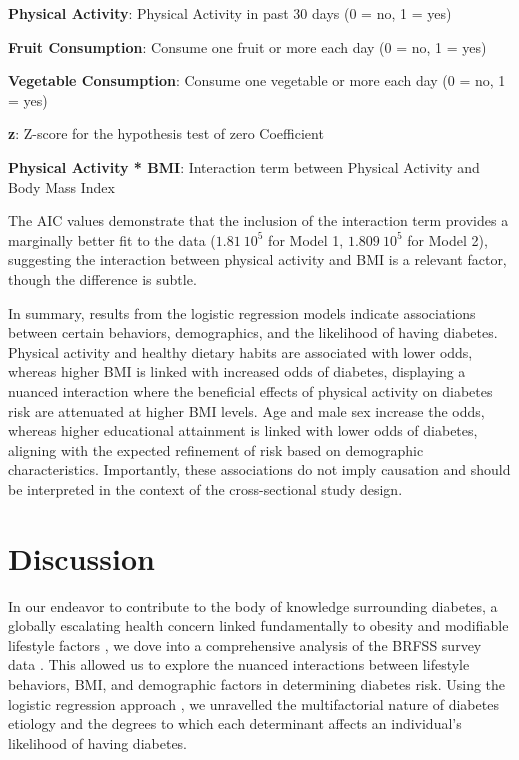 \documentclass[11pt]{article}
\begin{document}
\begin{table}[h]
\begin{threeparttable}
\begin{tablenotes}
\item \textbf{Physical Activity}: Physical Activity in past 30 days (0 = no, 1 = yes)
\item \textbf{Fruit Consumption}: Consume one fruit or more each day (0 = no, 1 = yes)
\item \textbf{Vegetable Consumption}: Consume one vegetable or more each day (0 = no, 1 = yes)
\item \textbf{z}: Z-score for the hypothesis test of zero Coefficient
\item \textbf{Physical Activity * BMI}: Interaction term between Physical Activity and Body Mass Index
\end{tablenotes}
\end{threeparttable}
\end{table}


The AIC values demonstrate that the inclusion of the interaction term provides a marginally better fit to the data (\hyperlink{R1b}{$1.81\ 10^{5}$} for Model 1, \hyperlink{R2b}{$1.809\ 10^{5}$} for Model 2), suggesting the interaction between physical activity and BMI is a relevant factor, though the difference is subtle. 

In summary, results from the logistic regression models indicate associations between certain behaviors, demographics, and the likelihood of having diabetes. Physical activity and healthy dietary habits are associated with lower odds, whereas higher BMI is linked with increased odds of diabetes, displaying a nuanced interaction where the beneficial effects of physical activity on diabetes risk are attenuated at higher BMI levels. Age and male sex increase the odds, whereas higher educational attainment is linked with lower odds of diabetes, aligning with the expected refinement of risk based on demographic characteristics. Importantly, these associations do not imply causation and should be interpreted in the context of the cross-sectional study design.

\section*{Discussion}

In our endeavor to contribute to the body of knowledge surrounding diabetes, a globally escalating health concern linked fundamentally to obesity and modifiable lifestyle factors \cite{Chan1994ObesityFD, McAllister2009TenPC, Powell-Wiley2021ObesityAC}, we dove into a comprehensive analysis of the BRFSS survey data \cite{Rolle-Lake2020BehavioralRF, Pierannunzi2013ASR}. This allowed us to explore the nuanced interactions between lifestyle behaviors, BMI, and demographic factors in determining diabetes risk. Using the logistic regression approach \cite{Menard1996AppliedLR, Peduzzi1996ASS}, we unravelled the multifactorial nature of diabetes etiology and the degrees to which each determinant affects an individual's likelihood of having diabetes.
\end{document}
